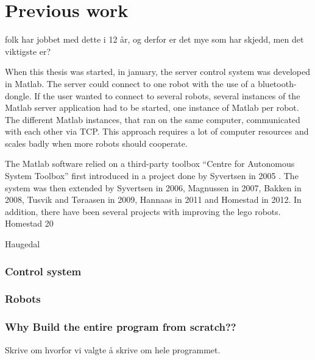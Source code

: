 \section{Previous work}
folk har jobbet med dette i 12 år, og derfor er det mye som har skjedd, men det viktigste er?


When this thesis was started, in january, the server control system was developed in Matlab. The server could connect to one robot with the use of a bluetooth-dongle. If the user wanted to connect to several robots, several instances of the Matlab server application had to be started, one instance of Matlab per robot. The different Matlab instances, that ran on the same computer, communicated with each other via TCP. This approach requires a lot of computer resources and scales badly when more robots should cooperate.

The Matlab software relied on a third-party toolbox ``Centre for Autonomous System Toolbox'' first introduced in a project done by Syvertsen in 2005 \cite{syvertsen}. The system was then extended by Syvertsen in 2006, Magnussen in 2007, Bakken in 2008, Tusvik and Tøraasen in 2009, Hannaas in 2011 and Homestad in 2012. In addition, there have been several projects with improving the lego robots. Homestad 20

Haugedal 



\subsubsection{Control system}
\subsubsection{Robots}

\subsubsection{Why Build the entire program from scratch??}
Skrive om hvorfor vi valgte å skrive om hele programmet.

